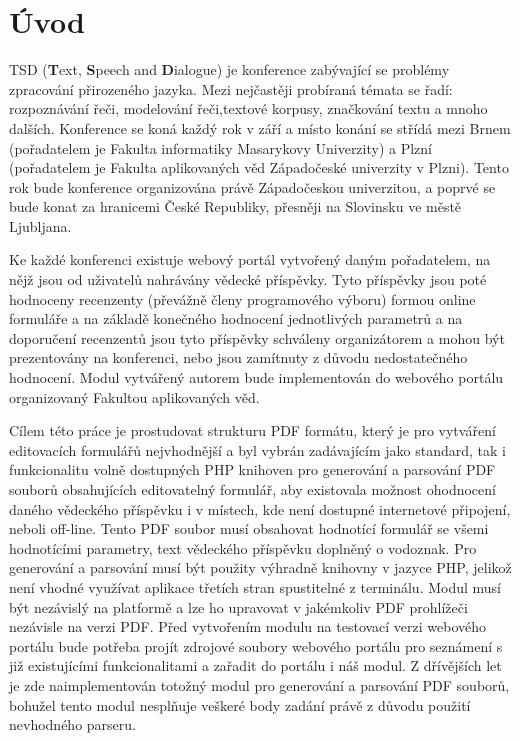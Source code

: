 \chapter{Úvod}
TSD (\textbf{T}ext, \textbf{S}peech and \textbf{D}ialogue) je konference zabývající se problémy zpracování přirozeného jazyka. Mezi nejčastěji probíraná témata se řadí: rozpoznávání řeči, modelování řeči,textové korpusy, značkování textu a mnoho dalších. Konference se koná každý rok v září a místo konání se střídá mezi Brnem (pořadatelem je Fakulta informatiky Masarykovy Univerzity) a Plzní (pořadatelem je Fakulta aplikovaných věd Západočeské univerzity v Plzni). Tento rok bude konference organizována právě Západočeskou univerzitou, a poprvé se bude konat za hranicemi České Republiky, přesněji na Slovinsku ve městě Ljubljana.
\par
 Ke každé konferenci existuje webový portál vytvořený daným pořadatelem, na nějž jsou od uživatelů nahrávány vědecké příspěvky. Tyto příspěvky jsou poté hodnoceny recenzenty (převážně členy programového výboru) formou online formuláře a na základě konečného hodnocení jednotlivých parametrů a na doporučení recenzentů jsou tyto příspěvky schváleny organizátorem a mohou být prezentovány na konferenci, nebo jsou zamítnuty z důvodu nedostatečného hodnocení. Modul vytvářený autorem bude implementován do webového portálu organizovaný Fakultou aplikovaných věd.
\par
Cílem této práce je prostudovat strukturu PDF formátu, který je pro vytváření editovacích formulářů nejvhodnější a byl vybrán zadávajícím jako standard, tak i funkcionalitu volně dostupných PHP knihoven pro generování a parsování PDF souborů obsahujících editovatelný formulář, aby existovala možnost ohodnocení daného vědeckého příspěvku i v místech, kde není dostupné internetové připojení, neboli off-line. Tento PDF soubor musí obsahovat hodnotící formulář se všemi hodnotícími parametry, text vědeckého příspěvku doplněný o vodoznak. Pro generování a parsování musí být použity výhradně knihovny v jazyce PHP, jelikož není vhodné využívat aplikace třetích stran spustitelné z terminálu. Modul musí být nezávislý na platformě a lze ho upravovat v jakémkoliv PDF prohlížeči nezávisle na verzi PDF. Před vytvořením modulu na testovací verzi webového portálu bude potřeba projít zdrojové soubory webového portálu pro seznámení s již existujícími funkcionalitami a zařadit do portálu i náš modul. Z dřívějších let je zde naimplementován totožný modul pro generování a parsování PDF souborů, bohužel tento modul nesplňuje veškeré body zadání právě z důvodu použití nevhodného parseru.
 